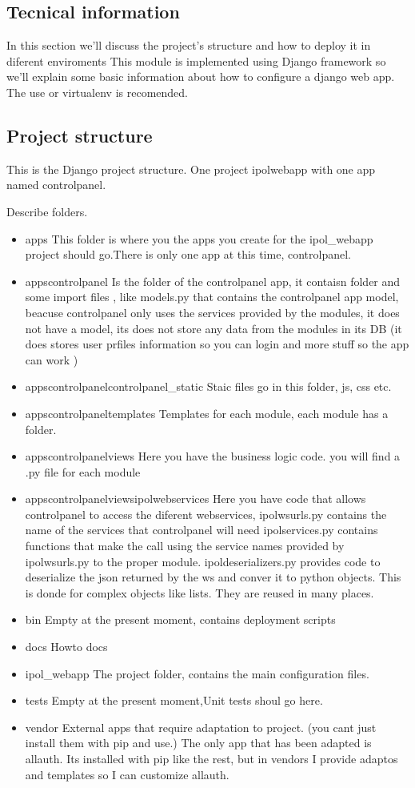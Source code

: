 \subsection{Tecnical information}
In this section we'll discuss the project's structure and how to deploy it in diferent enviroments
This module is implemented using Django framework so we'll explain some basic information about how to configure a django web app.
The use or virtualenv is recomended.

\subsection{Project structure}
This is the Django project structure.
One project ipolwebapp with one app named controlpanel.

Describe folders.

\begin{itemize}
\item  apps
This folder is where you the apps you create for the ipol\_webapp project should go.There is only one app at this time, controlpanel.
\item  apps\/controlpanel
Is the folder of the controlpanel app, it contaisn folder and some import files , like models.py that contains the controlpanel app model, beacuse controlpanel only uses the services provided by the modules, it does not have a model, its does not store any data from the modules in its DB (it does stores user prfiles information so you can login and more stuff so the app can work )
\item  apps\/controlpanel\/controlpanel\_static
Staic files go in this folder, js, css etc.
\item  apps\/controlpanel\/templates
Templates for each module, each module has a folder.
\item  apps\/controlpanel\/views
Here you have the business logic code. you will find a .py file for each module
\item  apps\/controlpanel\/views\/ipolwebservices
Here you have code that allows controlpanel to access the diferent webservices, 
ipolwsurls.py contains the name of the services that controlpanel will need
ipolservices.py contains functions that make the call using the service names provided by ipolwsurls.py to the proper module.
ipoldeserializers.py provides code to deserialize the json returned by the ws and conver it to python objects. This is donde for complex objects like lists. They are reused in many places. 
\item  bin
Empty at the present moment, contains deployment scripts
\item  docs
Howto docs
\item  ipol\_webapp
The project folder, contains the main configuration files.
\item  tests
Empty at the present moment,Unit tests shoul go here.
\item  vendor
External apps that require adaptation to project. (you cant just install them with pip and use.)
The only app that has been adapted is allauth. Its installed with pip like the rest, but in vendors I provide adaptos and templates so I can customize allauth.
\end{itemize}

